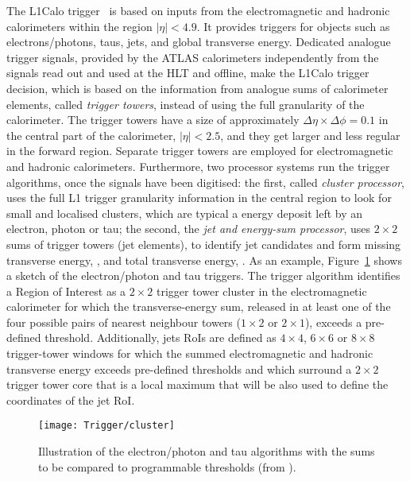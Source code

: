 			The \ac{L1Calo} trigger~\cite{ATLASJINST, ATLASL1CaloTrig} is based on inputs from the electromagnetic and hadronic calorimeters within the region $\left | \eta \right |<4.9$. It provides triggers for objects such as electrons/photons, taus, jets, and global transverse energy. Dedicated analogue trigger signals, provided by the \ac{ATLAS} calorimeters independently from the signals read out and used at the \ac{HLT} and offline, make the \ac{L1Calo} trigger decision, which is based on the information from analogue sums of calorimeter elements, called \emph{trigger towers}, instead of using the full granularity of the calorimeter. The trigger towers have a size of approximately $\Delta \eta \times \Delta \phi = 0.1$ in the central part of the calorimeter, $\left | \eta \right | < 2.5$, and they get larger and less regular in the forward region. Separate trigger towers are employed for electromagnetic and hadronic calorimeters. Furthermore, two processor systems run the trigger algorithms, once the signals have been digitised: the first, called \emph{cluster processor}, uses the full \ac{L1} trigger granularity information in the central region to look for small and localised clusters, which are typical a energy deposit left by an electron, photon or tau; the second, the \emph{jet and energy-sum processor}, uses $2 \times 2$ sums of trigger towers (jet elements), to identify jet candidates and form missing transverse energy, \met, and total transverse energy, \et. As an example, Figure~\ref{fig:calo_cluster} shows a sketch of the electron/photon and tau triggers. The trigger algorithm identifies a Region of Interest as a $2 \times 2$ trigger tower cluster in the electromagnetic calorimeter for which the transverse-energy sum, released in at least one of the four possible pairs of nearest neighbour towers ($1 \times 2$ or $2 \times 1$), exceeds a pre-defined threshold. Additionally, jets \ac{RoI}s are defined as $4 \times 4$, $6 \times 6$ or $8 \times 8$ trigger-tower windows for which the summed electromagnetic and hadronic transverse energy exceeds pre-defined thresholds and which surround a $2 \times 2$ trigger tower core that is a local maximum that will be also used to define the coordinates of the jet \ac{RoI}.

			\begin{figure}[!htb]
				\centering
				\texttt{[image: Trigger/cluster]}
				\caption{\label{fig:calo_cluster} Illustration of the electron/photon and tau algorithms with the sums to be compared to programmable thresholds (from \cite{ATLASTrigger2010}).}
			\end{figure}


